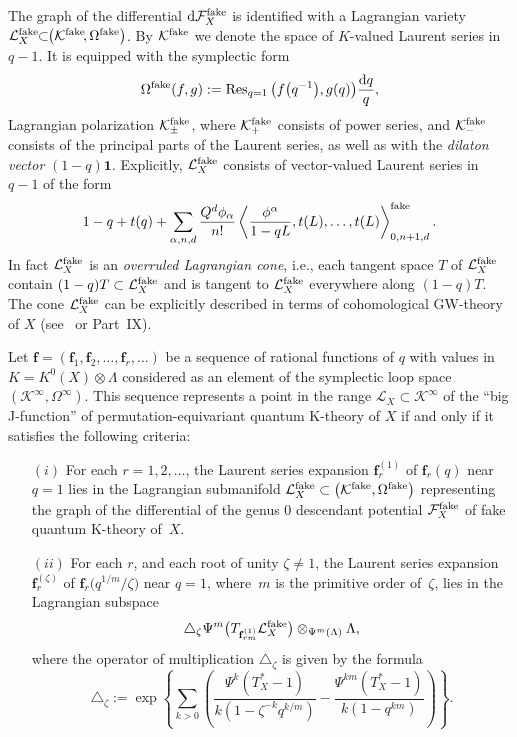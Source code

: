 \documentclass[pdftex]{sigma}
\def\F{\mathcal F}
\def\K{\mathcal K}
\def\L{\mathcal L}
\def\1{\mathbf 1}
\def\Res{\operatorname{Res}}
\def\a{\alpha}
\def\f{{\mathbf f}}
\def\lan{\langle}
\def\ran{\rangle}
\renewcommand{\Delta}{\triangle}
\begin{document}
The graph of the differential ${\rm d}\F_X^{\rm fake}$ is identified
with a Lagrangian variety $\L_X^{\rm fake}\!\!\subset\!\! \big(\K^{\rm fake}\!,\Omega^{\rm fake}\big)$. By $\K^{\rm fake}$ we denote the space of $K$-valued Laurent series in $q-1$. It is equipped with the symplectic form
\[ \Omega^{\rm fake}(f,g):=\Res_{q=1} \big(f\big(q^{-1}\big),g(q)\big) \frac{{\rm d}q}{q},\]
Lagrangian polarization $\K^{\rm fake}_{\pm}$, where $\K^{\rm fake}_{+}$ consists of power series, and $\K^{\rm fake}_{-}$ consists of the principal parts of the Laurent series, as well as with the {\em dilaton vector} $(1-q)\1$.
Explicitly, $\L_X^{\rm fake}$ consists of vector-valued Laurent series in $q-1$ of the form
\[ 1-q + t(q) + \sum_{\a,n,d} \frac{Q^d\phi_{\a}}{n!}\left\lan \frac{\phi^{\a}}{1-qL}, t(L),\dots, t(L)\right\ran^{\rm fake}_{0,n+1,d}.\]
In fact $\L_X^{\rm fake}$ is an {\em overruled Lagrangian cone}, i.e., each tangent space $T$ of $\L_X^{\rm fake}$ contain $(1-q)T \subset \L_X^{\rm fake}$ and is tangent to $\L_X^{\rm fake}$ everywhere along $(1-q)T$. The cone $\L_X^{\rm fake}$ can be explicitly described in terms of cohomological GW-theory of $X$ (see~\cite{Co, GiF, GiTo} or Part~IX).

\begin{theorem}\label{Theorem1} Let $\f = (\f_1,\f_2,\dots, \f_r,\dots)$ be a sequence of rational functions of $q$ with values in $K=K^0(X)\otimes \Lambda$ considered as an element of the symplectic loop space
 $(\K^{\infty}, \Omega^{\infty})$. This sequence represents a point in the range
 $\L_X \subset \K^{\infty}$ of the ``big J-function'' of permutation-equivariant quantum K-theory of $X$ if and only if it satisfies the following
 criteria:
\begin{enumerate}\itemsep=0pt
\item[$(i)$] For each $r=1,2,\dots$, the Laurent series expansion $\f_r^{(1)}$ of $\f_r(q)$ near $q=1$ lies in the Lagrangian submanifold $\L_X^{\rm fake} \subset \big(\K^{\rm fake}, \Omega^{\rm fake}\big)$ representing the graph of the differential of the genus $0$ descendant potential $\F_X^{\rm fake}$ of fake quantum K-theory of~$X$.
\item[$(ii)$] For each $r$, and each root of unity $\zeta\neq 1$, the Laurent series expansion $\f_r^{(\zeta)}$ of $\f_r\big(q^{1/m}/\zeta\big)$ near $q=1$, where~$m$ is the primitive order of~$\zeta$, lies in the Lagrangian subspace
 \[ \Delta_{\zeta} \Psi^m\big(T_{\f_{rm}^{(1)}}\L_X^{\rm fake}\big) \otimes_{\Psi^m(\Lambda)}\Lambda,\]
 where the operator of multiplication $\Delta_{\zeta}$ is given by the formula
 \[ \Delta_{\zeta}:= \exp\left\{\sum_{k>0}\left(\frac{\Psi^{k}(T^*_X-1)}{k(1-\zeta^{-k}q^{k/m})} -\frac{\Psi^{km}(T^*_X-1)}{k(1-q^{km})}\right)\right\}.\] \end{enumerate}
\end{theorem}
\end{document}
